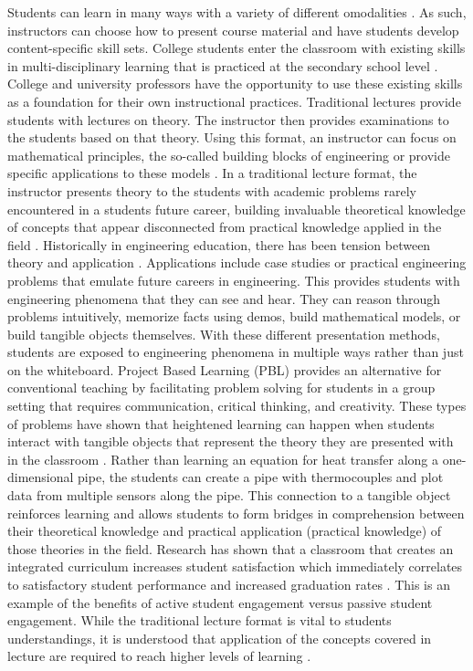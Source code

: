 Students can learn in many ways with a variety of different
omodalities \cite{Gardner}. As such, instructors can choose how to
present course material and have students develop content-specific
skill sets. College students enter the classroom with existing skills
in multi-disciplinary learning that is practiced at the secondary
school level \cite{Ralph}. College and university professors have
the opportunity to use these existing skills as a foundation for their
own instructional practices. Traditional lectures provide students
with lectures on theory. The instructor then provides examinations to
the students based on that theory. Using this format, an instructor
can focus on mathematical principles, the so-called building blocks of
engineering or provide specific applications to these
models \cite{Learning_Styles}. In a traditional lecture format,
the instructor presents theory to the students with academic problems
rarely encountered in a students future career, building invaluable
theoretical knowledge of concepts that appear disconnected from
practical knowledge applied in the field \cite{Yong}. Historically
in engineering education, there has been tension between theory and
application \cite{PBL1}.  Applications include case studies or
practical engineering problems that emulate future careers in
engineering. This provides students with engineering phenomena that
they can see and hear. They can reason through problems intuitively,
memorize facts using demos, build mathematical models, or build
tangible objects themselves. With these different presentation
methods, students are exposed to engineering phenomena in multiple
ways rather than just on the
whiteboard\cite{Learning_Styles}. Project Based Learning (PBL)
provides an alternative for conventional teaching by facilitating
problem solving for students in a group setting that requires
communication, critical thinking, and creativity. These types of
problems have shown that heightened learning can happen when students
interact with tangible objects that represent the theory they are
presented with in the classroom \cite{PBL_Book}. Rather than
learning an equation for heat transfer along a one-dimensional pipe,
the students can create a pipe with thermocouples and plot data from
multiple sensors along the pipe. This connection to a tangible object
reinforces learning and allows students to form bridges in
comprehension between their theoretical knowledge and practical
application (practical knowledge) of those theories in the
field\cite{TANGIBLEINTERFACES}. Research has shown that a
classroom that creates an integrated curriculum increases student
satisfaction which immediately correlates to satisfactory student
performance and increased graduation
rates \cite{StudentSatisfaction}. This is an example of the
benefits of active student engagement versus passive student
engagement. While the traditional lecture format is vital to students
understandings, it is understood that application of the concepts
covered in lecture are  
required to reach higher levels of learning \cite{Armstrong}.  

